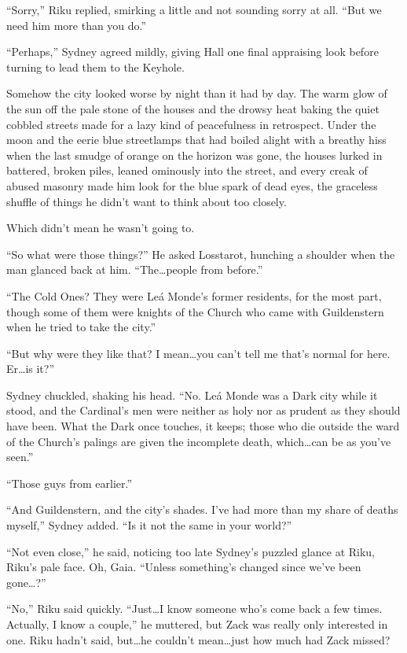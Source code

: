 ``Sorry,'' Riku replied, smirking a little and not sounding sorry at all. ``But we need him more than you do.''

``Perhaps,'' Sydney agreed mildly, giving Hall one final appraising look before turning to lead them to the Keyhole.

Somehow the city looked worse by night than it had by day. The warm glow of the sun off the pale stone of the houses and the drowsy heat baking the quiet cobbled streets made for a lazy kind of peacefulness in retrospect. Under the moon and the eerie blue streetlamps that had boiled alight with a breathy hiss when the last smudge of orange on the horizon was gone, the houses lurked in battered, broken piles, leaned ominously into the street, and every creak of abused masonry made him look for the blue spark of dead eyes, the graceless shuffle of things he didn't want to think about too closely.

Which didn't mean he wasn't going to.

``So what were those things?'' He asked Losstarot, hunching a shoulder when the man glanced back at him. ``The\ldots people from before.''

``The Cold Ones? They were Leá Monde's former residents, for the most part, though some of them were knights of the Church who came with Guildenstern when he tried to take the city.''

``But why were they like that? I mean\ldots you can't tell me that's normal for here. Er\ldots is it?''

Sydney chuckled, shaking his head. ``No. Leá Monde was a Dark city while it stood, and the Cardinal's men were neither as holy nor as prudent as they should have been. What the Dark once touches, it keeps; those who die outside the ward of the Church's palings are given the incomplete death, which\ldots can be as you've seen.''

``Those guys from earlier.''

``And Guildenstern, and the city's shades. I've had more than my share of deaths myself,'' Sydney added. ``Is it not the same in your world?''

``Not even close,'' he said, noticing too late Sydney's puzzled glance at Riku, Riku's pale face. Oh, Gaia. ``Unless something's changed since we've been gone\ldots ?''

``No,'' Riku said quickly. ``Just\ldots I know someone who's come back a few times. Actually, I know a couple,'' he muttered, but Zack was really only interested in one. Riku hadn't said, but\ldots he couldn't mean\ldots just how much had Zack missed?


